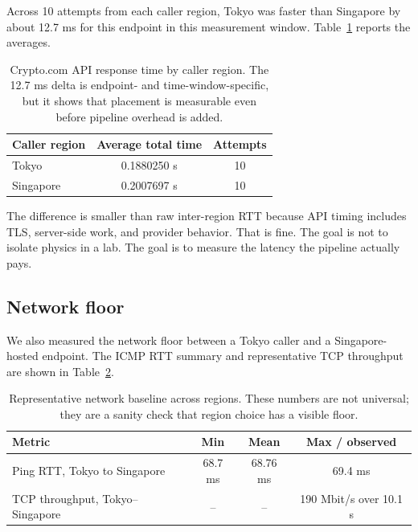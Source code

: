\documentclass[11pt, reqno]{amsart}
\begin{document}
Across 10 attempts from each caller region, Tokyo was faster than Singapore by about 12.7 ms for this endpoint in this measurement window. Table~\ref{tab:api_timing} reports the averages.

\begin{table}[H]
\centering
\begin{tabular}{lcc}
\toprule
\textbf{Caller region} & \textbf{Average total time} & \textbf{Attempts} \\
\midrule
Tokyo & 0.1880250 s & 10 \\
Singapore & 0.2007697 s & 10 \\
\bottomrule
\end{tabular}
\caption{Crypto.com API response time by caller region. The 12.7 ms delta is endpoint- and time-window-specific, but it shows that placement is measurable even before pipeline overhead is added.}
\label{tab:api_timing}
\end{table}

The difference is smaller than raw inter-region RTT because API timing includes TLS, server-side work, and provider behavior. That is fine. The goal is not to isolate physics in a lab. The goal is to measure the latency the pipeline actually pays.

\subsection{Network floor}

We also measured the network floor between a Tokyo caller and a Singapore-hosted endpoint. The ICMP RTT summary and representative TCP throughput are shown in Table~\ref{tab:network_floor}.

\begin{table}[H]
\centering
\begin{tabular}{lccc}
\toprule
\textbf{Metric} & \textbf{Min} & \textbf{Mean} & \textbf{Max / observed} \\
\midrule
Ping RTT, Tokyo to Singapore & 68.7 ms & 68.76 ms & 69.4 ms \\
TCP throughput, Tokyo--Singapore & -- & -- & 190 Mbit/s over 10.1 s \\
\bottomrule
\end{tabular}
\caption{Representative network baseline across regions. These numbers are not universal; they are a sanity check that region choice has a visible floor.}
\label{tab:network_floor}
\end{table}

\end{document}
